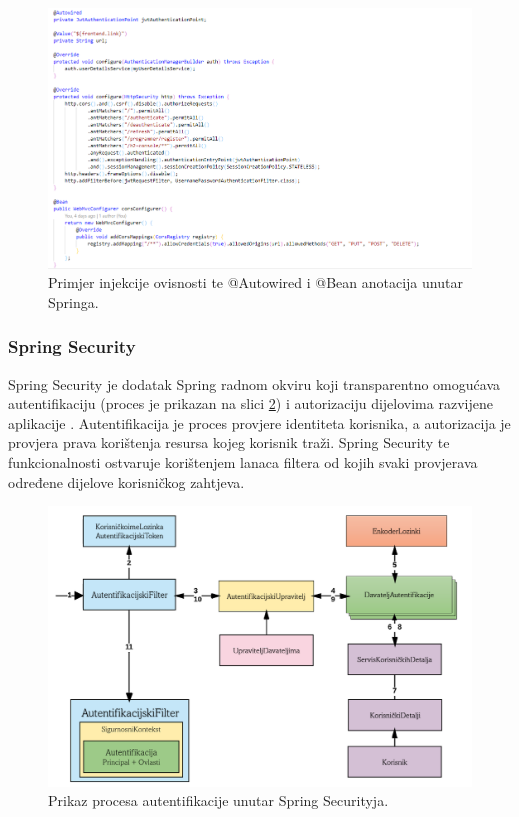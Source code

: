 \documentclass[times, utf8, zavrsni]{fer}
\begin{document}
			\begin{figure}[H]
				\centering
				\includegraphics[width=\linewidth]{pictures/prikazi/Spring.png}
				\caption{Primjer injekcije ovisnosti te @Autowired i @Bean anotacija unutar Springa.}
				\label{fig:spring}
			\end{figure}
			
			\subsubsection{Spring Security}
			Spring Security je dodatak Spring radnom okviru koji transparentno omogućava autentifikaciju  (proces je prikazan na slici \ref{fig:springsec}) i autorizaciju  dijelovima razvijene aplikacije . Autentifikacija je proces provjere identiteta korisnika, a autorizacija je provjera prava korištenja resursa kojeg korisnik traži. Spring Security te funkcionalnosti ostvaruje korištenjem lanaca filtera  od kojih svaki provjerava određene dijelove korisničkog zahtjeva.
			\begin{figure}[H]
				\centering
				\includegraphics[width=\linewidth]{pictures/prikazi/SpringSecurity.png}
				\caption{Prikaz procesa autentifikacije unutar Spring Securityja.}
				\label{fig:springsec}
			\end{figure}
			
\end{document}

